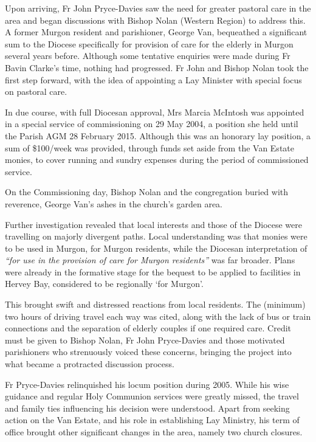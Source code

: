 Upon arriving, Fr John Pryce-Davies saw the need for greater pastoral care in the area and began discussions with Bishop Nolan (Western Region) to address this. A former Murgon resident and parishioner, George Van, bequeathed a significant sum to the Diocese specifically for provision of care for the elderly in Murgon several years before. Although some tentative enquiries were made during Fr Bavin Clarke's time, nothing had progressed. Fr John and Bishop Nolan took the first step forward, with the idea of appointing a Lay Minister with special focus on pastoral care.

In due course, with full Diocesan approval, Mrs Marcia McIntosh was appointed in a special service of commissioning on 29 May 2004, a position she held until the Parish AGM 28 February 2015. Although this was an honorary lay position, a sum of \$100/week was provided, through funds set aside from the Van Estate monies, to cover running and sundry expenses during the period of commissioned service.

On the Commissioning day, Bishop Nolan and the congregation buried with reverence, George Van's ashes in the church's garden area.

Further investigation revealed that local interests and those of the Diocese were travelling on majorly divergent paths. Local understanding was that monies were to be used in Murgon, for Murgon residents, while the Diocesan interpretation of \emph{``for use in the provision of care for Murgon residents''} was far broader. Plans were already in the formative stage for the bequest to be applied to facilities in Hervey Bay, considered to be regionally `for Murgon'.

This brought swift and distressed reactions from local residents. The (minimum) two hours of driving travel each way was cited, along with the lack of bus or train connections and the separation of elderly couples if one required care. Credit must be given to Bishop Nolan, Fr John Pryce-Davies and those motivated parishioners who strenuously voiced these concerns, bringing the project into what became a protracted discussion process.

Fr Pryce-Davies relinquished his locum position during 2005. While his wise guidance and regular Holy Communion services were greatly missed, the travel and family ties influencing his decision were understood. Apart from seeking action on the Van Estate, and his role in establishing Lay Ministry, his term of office brought other significant changes in the area, namely two church closures.

